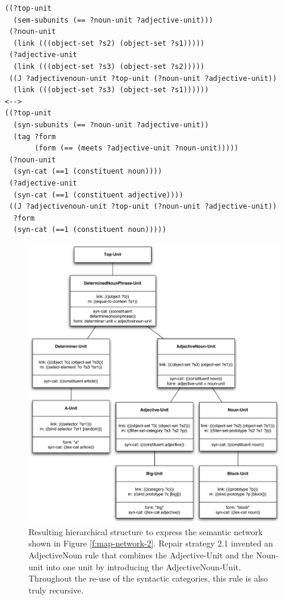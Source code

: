 \footnotesize
\begin{Verbatim}[frame=lines, label=AdjectiveNoun rule]
((?top-unit 
  (sem-subunits (== ?noun-unit ?adjective-unit)))
 (?noun-unit 
  (link (((object-set ?s2) (object-set ?s1)))))
 (?adjective-unit 
  (link (((object-set ?s3) (object-set ?s2)))))
 ((J ?adjectivenoun-unit ?top-unit (?noun-unit ?adjective-unit))
  (link (((object-set ?s3) (object-set ?s1))))))
<-->
((?top-unit
  (syn-subunits (== ?noun-unit ?adjective-unit))
  (tag ?form 
       (form (== (meets ?adjective-unit ?noun-unit)))))
 (?noun-unit
  (syn-cat (==1 (constituent noun))))
 (?adjective-unit 
  (syn-cat (==1 (constituent adjective))))
 ((J ?adjectivenoun-unit ?top-unit (?noun-unit ?adjective-unit))
  ?form
  (syn-cat (==1 (constituent noun)))))
\end{Verbatim}
\normalsize

\begin{figure}[htbp]
  \begin{center}
    \includegraphics[width=\textwidth]{./composition/figures/learning-3.pdf}
    \caption[Third resulting linguistic structure to express semantic
    constraint networks which is hierarchical]{Resulting hierarchical structure
      to express the semantic network shown in Figure
      \ref{f:map-network-2}. Repair strategy 2.1 invented an
      AdjectiveNoun rule that combines the Adjective-Unit and the
      Noun-unit into one unit by introducing the
      AdjectiveNoun-Unit. Throughout the re-use of the syntactic
      categories, this rule is also truly recursive.}
    \label{f:map-structure-3}
  \end{center}
\end{figure}

